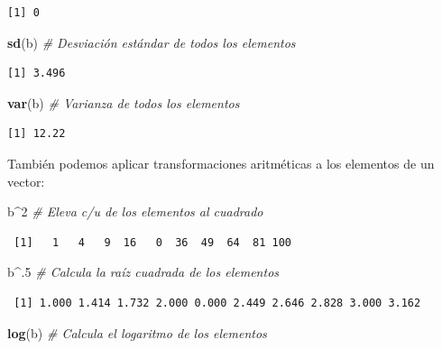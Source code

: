 \documentclass[12pt,spanish,]{book}
\newenvironment{Shaded}{\begin{snugshade}}{\end{snugshade}}
\newcommand{\CommentTok}[1]{\textcolor[rgb]{0.56,0.35,0.01}{\textit{#1}}}
\newcommand{\DecValTok}[1]{\textcolor[rgb]{0.00,0.00,0.81}{#1}}
\newcommand{\KeywordTok}[1]{\textcolor[rgb]{0.13,0.29,0.53}{\textbf{#1}}}
\newcommand{\NormalTok}[1]{#1}
\newcommand{\OperatorTok}[1]{\textcolor[rgb]{0.81,0.36,0.00}{\textbf{#1}}}
\begin{document}
\begin{verbatim}
[1] 0
\end{verbatim}

\begin{Shaded}
\begin{Highlighting}[]
\KeywordTok{sd}\NormalTok{(b)       }\CommentTok{# Desviación estándar de todos los elementos}
\end{Highlighting}
\end{Shaded}

\begin{verbatim}
[1] 3.496
\end{verbatim}

\begin{Shaded}
\begin{Highlighting}[]
\KeywordTok{var}\NormalTok{(b)      }\CommentTok{# Varianza de todos los elementos}
\end{Highlighting}
\end{Shaded}

\begin{verbatim}
[1] 12.22
\end{verbatim}

También podemos aplicar transformaciones aritméticas a los elementos de un vector:

\begin{Shaded}
\begin{Highlighting}[]
\NormalTok{b}\OperatorTok{^}\DecValTok{2}               \CommentTok{# Eleva c/u de los elementos al cuadrado}
\end{Highlighting}
\end{Shaded}

\begin{verbatim}
 [1]   1   4   9  16   0  36  49  64  81 100
\end{verbatim}

\begin{Shaded}
\begin{Highlighting}[]
\NormalTok{b}\OperatorTok{^}\NormalTok{.}\DecValTok{5}              \CommentTok{# Calcula la raíz cuadrada de los elementos}
\end{Highlighting}
\end{Shaded}

\begin{verbatim}
 [1] 1.000 1.414 1.732 2.000 0.000 2.449 2.646 2.828 3.000 3.162
\end{verbatim}

\begin{Shaded}
\begin{Highlighting}[]
\KeywordTok{log}\NormalTok{(b)            }\CommentTok{# Calcula el logaritmo de los elementos}
\end{Highlighting}
\end{Shaded}
\end{document}

